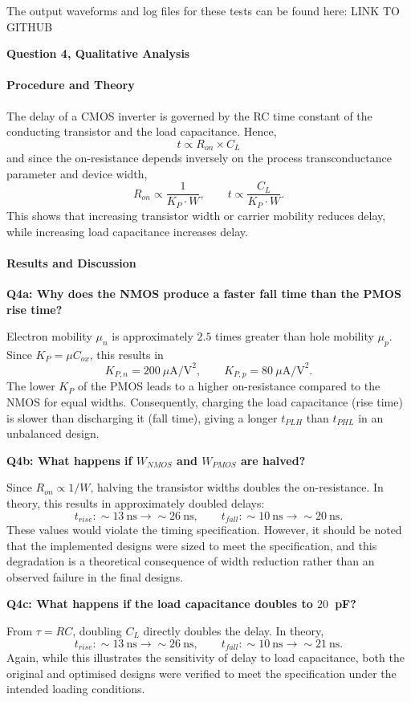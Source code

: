 \documentclass[a4paper,12pt]{article}
\begin{document}
The output waveforms and log files for these tests can be found here: LINK TO GITHUB

\textbf{Question 4, Qualitative Analysis}

\paragraph{Procedure and Theory}
The delay of a CMOS inverter is governed by the RC time constant of the conducting transistor and the load capacitance. Hence,
\[
t \propto R_{on} \times C_L
\]
and since the on-resistance depends inversely on the process transconductance parameter and device width,
\[
R_{on} \propto \frac{1}{K_P \cdot W},
\qquad
t \propto \frac{C_L}{K_P \cdot W}.
\]
This shows that increasing transistor width or carrier mobility reduces delay, while increasing load capacitance increases delay.

\paragraph{Results and Discussion}
\textbf{Q4a: Why does the NMOS produce a faster fall time than the PMOS rise time?}

Electron mobility $\mu_n$ is approximately $2.5$ times greater than hole mobility $\mu_p$. Since $K_P = \mu C_{ox}$, this results in
\[
K_{P,n} = 200~\mu\text{A/V}^2, 
\qquad
K_{P,p} = 80~\mu\text{A/V}^2.
\]
The lower $K_P$ of the PMOS leads to a higher on-resistance compared to the NMOS for equal widths. Consequently, charging the load capacitance (rise time) is slower than discharging it (fall time), giving a longer $t_{PLH}$ than $t_{PHL}$ in an unbalanced design.

\textbf{Q4b: What happens if $W_{NMOS}$ and $W_{PMOS}$ are halved?}

Since $R_{on} \propto 1/W$, halving the transistor widths doubles the on-resistance. In theory, this results in approximately doubled delays:
\[
t_{rise}: \sim 13~\text{ns} \rightarrow \sim 26~\text{ns},
\qquad
t_{fall}: \sim 10~\text{ns} \rightarrow \sim 20~\text{ns}.
\]
These values would violate the timing specification. However, it should be noted that the implemented designs were sized to meet the specification, and this degradation is a theoretical consequence of width reduction rather than an observed failure in the final designs.

\textbf{Q4c: What happens if the load capacitance doubles to $20$~pF?}

From $\tau = RC$, doubling $C_L$ directly doubles the delay. In theory,
\[
t_{rise}: \sim 13~\text{ns} \rightarrow \sim 26~\text{ns},
\qquad
t_{fall}: \sim 10~\text{ns} \rightarrow \sim 21~\text{ns}.
\]
Again, while this illustrates the sensitivity of delay to load capacitance, both the original and optimised designs were verified to meet the specification under the intended loading conditions.
\end{document}

